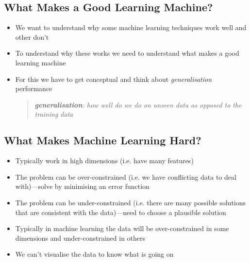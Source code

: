 \setcounter{outlineitem}{1}

\Outline %


\begin{slide}
\section{What Makes a Good Learning Machine?}

\begin{PauseHighLight}
  \begin{itemize}
  \item We want to understand why some machine learning techniques
    work well and other don't\pause
  \item To understand why these works we need to understand what makes a
    good learning machine\pause
  \item For this we have to get conceptual and think about
    \emph{generalisation} performance\pause
    \begin{quote}\it
      \textbf{generalisation}: how well do we do on unseen data as
      opposed to the training data\pause
    \end{quote}
  \end{itemize}
\end{PauseHighLight}

\end{slide}


\begin{slide}
\section{What Makes Machine Learning Hard?}

\begin{PauseHighLight}
  \begin{itemize}
  \item Typically work in high dimensions (i.e. have many
    features)\pause
  \item The problem can be over-constrained (i.e. we have conflicting
    data to deal with)\pause---solve by minimising an error function\pauseb
  \item The problem can be under-constrained (i.e. there are many
    possible solutions that are consistent with the data)\pause---need to
    choose a plausible solution\pauseb
  \item Typically in machine learning the data will be over-constrained
    in some dimensions and under-constrained in others\pause
  \item We can't visualise the data to know what is going
    on\pause
  \end{itemize}
\end{PauseHighLight}

\end{slide}

